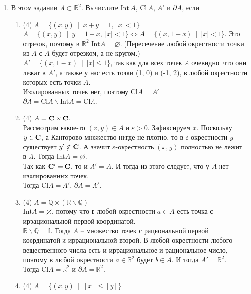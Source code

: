 \documentclass[a4paper]{article}
\def\eps{\varepsilon}
\def\Int{\mathrm{Int}}
\def\Cl{\mathrm{Cl}}
\begin{document}
\begin{enumerate}
    \item В этом задании $A\subset \mathbb R^2$. Вычислите $\Int\,A$, $\Cl\,A$, $A'$ и $\partial A$, если
    \begin{enumerate}
        \item (4) $A = \{ (x,y)\ \mid\ x+y = 1,\ |x|<1 \}$\\
        $A = \{ (x,y)\ \mid\ y = 1-x,\ |x|<1 \} \Leftrightarrow A = \{ (x,1-x)\ \mid\ |x|<1 \}$. Это отрезок, поэтому в $\mathbb R^2$ $\Int A = \varnothing$. (Пересечение любой окрестности точки из $A$ с $A$ будет отрезком, а не кругом.)\\
        $A' = \{ (x,1-x)\ \mid\ |x|\le1 \}$, так как для всех точек $A$ очевидно, что они лежат в $A'$, а также у нас есть точки (1, 0) и (-1, 2), в любой окрестности которых есть точки $A$.\\
        Изолированных точек нет, поэтому $\Cl A = A'$\\
        $\partial A = \Cl A \smallsetminus \Int A = \Cl A$.
        \item (4) $A = \mathrm{\bf C}\times \mathrm{\bf C}$.\\
        Рассмотрим какое-то $(x, y) \in A$ и $\eps > 0$. Зафиксируем $x$. Поскольку $y \in \mathrm{\bf C}$, а Канторово множество нигде не плотно, то в $\eps$-окрестности $y$ существует $y' \notin \mathrm{\bf C}$. А значит $\eps$-окрестность $(x, y)$ полностью не лежит в $A$. Тогда $\Int A = \varnothing$.\\
        Так как $\mathrm{\bf C}' = \mathrm{\bf C}$, то и $A' = A$. И тогда из этого следует, что у $A$ нет изолированных точек.\\
        Тогда $\Cl A = A'$, $\partial A = A'$.
        \item (4) $A = \mathbb Q\times (\mathbb R\smallsetminus \mathbb Q)$\\
        $\Int A = \varnothing$, потому что в любой окрестности $a \in A$ есть точка с иррациональной первой координатой.\\
        $\mathbb R\smallsetminus \mathbb Q = \mathbb I$. Тогда $A$ -- множество точек с рациональной первой координатой и иррациональной второй. В любой окрестности любого вещественного числа есть и иррациональное и рациональное число, поэтому в любой окрестности $a \in \mathbb R^2$ будет $b \in A$. И тогда $A' = \mathbb R^2$.\\
        Тогда $\Cl A = \mathbb R^2$ и $\partial A = \mathbb R^2$.
        \item (4) $A = \{(x,y)\ \mid\ [x] \leq [y]\}$\\

\end{enumerate}
\end{enumerate}
\end{document}
